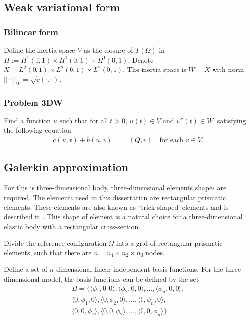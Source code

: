 \subsection{Weak variational form}

\subsubsection{Bilinear form}
Define the inertia space $V$ as the closure of $T(\Omega)$ in $H := H^1(0,1)\times H^1(0,1)\times H^1(0,1)$. Denote $X = L^2(0,1)\times L^2(0,1)\times L^2(0,1)$. The inertia space is $W  = X$ with norm $||\cdot||_W = \sqrt{c(\cdot,\cdot)}$.

\subsubsection{Problem 3DW}
Find a function $u$ such that for all $t>0$, $u(t) \in V$ and $u''(t) \in W$, satisfying the following equation
\begin{eqnarray}
	c(u,v) + b(u,v) & = & (Q,v) \ \ \ \textrm{ for each } v \in V.
\end{eqnarray}

\subsection{Galerkin approximation}
For this is three-dimensional body, three-dimensional elements shapes are required. The elements used in this dissertation are rectangular prismatic elements. These elements are also known as `brick-shaped' elements and is described in \cite{Wu06}. This shape of element is a natural choice for a three-dimensional elastic body with a rectangular cross-section.

Divide the reference configuration $\Omega$ into a grid of rectangular prismatic elements, such that there are $n = n_1 \times n_2 \times n_3$ nodes.

Define a set of $n$-dimensional linear independent basis functions. For the three-dimensional model, the basis functions can be defined by the set
\begin{eqnarray*}
 B = \{\langle\phi_1, 0 , 0\rangle, \langle\phi_2, 0, 0\rangle,...,\langle\phi_{n}, 0, 0 \rangle,\\
	\langle 0,\phi_1 ,0 \rangle,\langle 0 ,\phi_2,0\rangle,...,\langle 0,\phi_{n},0\rangle,\\
	\langle 0,0,\phi_1 \rangle,\langle 0,0,\phi_2\rangle,...,\langle 0,0,\phi_{n}\rangle \}.
\end{eqnarray*}

